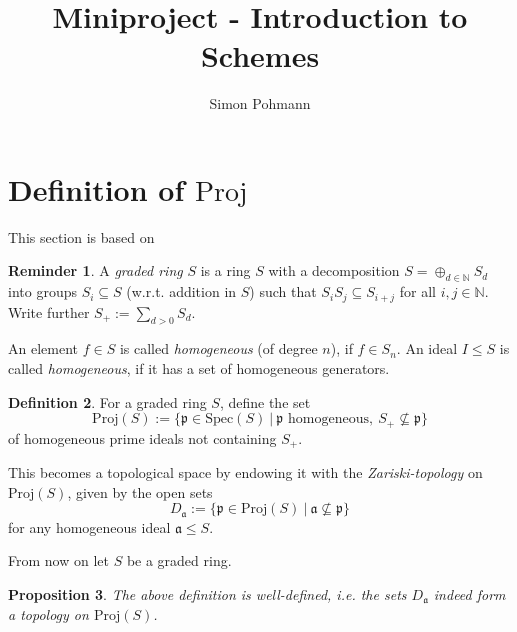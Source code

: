 \documentclass{scrartcl}
\title{Miniproject - Introduction to Schemes}
\author{Simon Pohmann}
\newcommand{\N}{\mathbb{N}}
\newcommand{\p}{\mathfrak{p}}
\renewcommand{\a}{\mathfrak{a}}
\newcommand{\Spec}{\mathrm{Spec}}
\newcommand{\Proj}{\mathrm{Proj}}
\newtheorem{prop}{Proposition}
\theoremstyle{definition}
\newtheorem{definition}[prop]{Definition}
\newtheorem{reminder}[prop]{Reminder}
\begin{document}
\maketitle

\section{Definition of $\Proj$}

This section is based on \cite[II.2]{hartshorne}
\begin{reminder}
    A \emph{graded ring} $S$ is a ring $S$ with a decomposition $S = \oplus_{d \in \N} S_d$ into groups $S_i \subseteq S$ (w.r.t. addition in $S$) such that $S_i S_j \subseteq S_{i + j}$ for all $i, j \in \N$.
    Write further $S_+ := \sum_{d > 0} S_d$.

    An element $f \in S$ is called \emph{homogeneous} (of degree $n$), if $f \in S_n$.
    An ideal $I \leq S$ is called \emph{homogeneous}, if it has a set of homogeneous generators.
\end{reminder}
\begin{definition}
    For a graded ring $S$, define the set
    \begin{equation*}
        \Proj(S) := \{ \p \in \Spec(S) \ | \ \text{$\p$ homogeneous}, \ S_+ \not\subseteq \p \}
    \end{equation*}
    of homogeneous prime ideals not containing $S_+$.

    This becomes a topological space by endowing it with the \emph{Zariski-topology} on $\Proj(S)$, given by the open sets
    \begin{equation*}
        D_{\a} := \{ \p \in \Proj(S) \ | \ \a \not\subseteq \p \}
    \end{equation*}
    for any homogeneous ideal $\a \leq S$.
\end{definition}
From now on let $S$ be a graded ring.
\begin{prop}
    The above definition is well-defined, i.e. the sets $D_\a$ indeed form a topology on $\Proj(S)$.
\end{prop}
\end{document}
